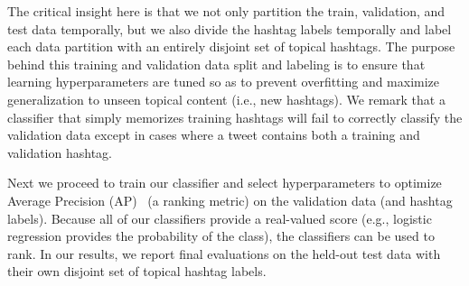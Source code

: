 The critical insight here is that we not only partition the train, validation, and test data 
temporally, but we also divide the hashtag labels temporally and label each data partition with
an entirely disjoint set of topical hashtags.
The purpose behind this training and validation data split
and labeling is to ensure that learning hyperparameters are tuned so as
to prevent overfitting and maximize generalization to unseen topical
content (i.e., new hashtags).
We remark that a classifier that simply
memorizes training hashtags will fail to correctly classify the validation data except in 
cases where a tweet contains both a training and validation hashtag.  

Next we proceed to train our classifier and  
select hyperparameters to optimize Average Precision (AP)~\cite{manning_ir} (a ranking
metric) on the validation data (and hashtag labels).
Because all of our classifiers provide a real-valued score (e.g., logistic regression
provides the probability of the class), the classifiers can be used to rank.
In our results, we report final evaluations on the held-out test data with their own
disjoint set of topical hashtag labels.

